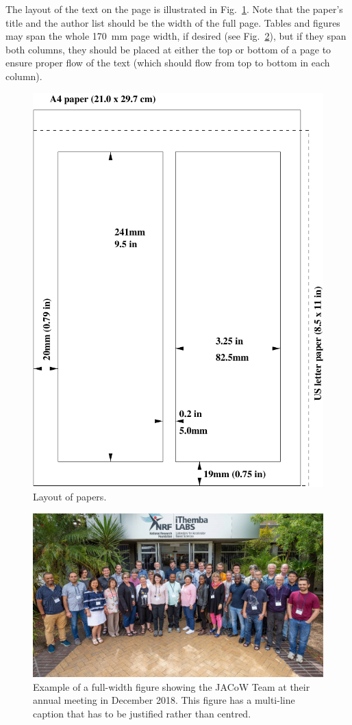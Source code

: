 \documentclass[a4paper,
               keeplastbox,   %
               ]{jacow}
\begin{document}
The layout of the text on the page is illustrated in
Fig.~\ref{fig:paper_layout}. Note that the paper’s title and the author list should
be the width of the full page. Tables and figures may span
the whole \SI{170}{mm} page width, if desired (see Fig.~\ref{fig:jacow_team}), but
if they span both columns, they should be placed at either
the top or bottom of a page to ensure proper flow of the
text (which should flow from top to bottom in each column).

\begin{figure}[!htb]
   \centering
   \includegraphics*[width=.7\columnwidth]{JACpic_mc}
   \caption{Layout of papers.}
   \label{fig:paper_layout}
\end{figure}

\begin{figure}[!tbh]
    \centering
    \includegraphics*[width=\textwidth]{JACpic2}

    \caption{Example of a full-width figure showing the JACoW Team at their annual
    	     meeting in December 2018. This figure has a multi-line caption that has to be
    	     justified rather than centred.}
    \label{fig:jacow_team}
\end{figure}
\end{document}
